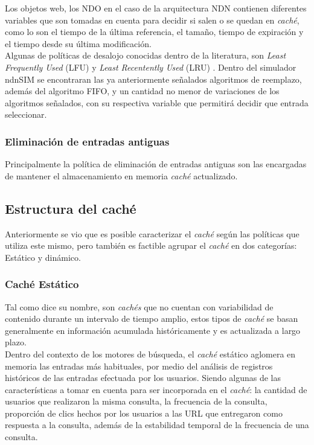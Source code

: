 \documentclass[12pt]{ociamthesis}  %
\begin{document}
Los objetos web, los NDO en el caso de la arquitectura NDN contienen diferentes variables que son tomadas en cuenta para decidir si salen o se quedan en \textit{caché}, como lo son el tiempo de la última referencia, el tamaño, tiempo de expiración y el tiempo desde su última modificación.\\

Algunas de políticas de desalojo conocidas dentro de la literatura, son \textit{Least Frequently Used} (LFU) y \textit{Least Recentently Used}
(LRU) \cite{gomez2014servicios}\cite{gan2009improved}\cite{cambazoglu2010refreshing}. Dentro del simulador ndnSIM se encontraran las ya anteriormente señalados algoritmos de reemplazo, además del algoritmo FIFO, y un cantidad no menor de variaciones de los algoritmos señalados, con su respectiva variable que permitirá decidir que entrada seleccionar.\\

\subsubsection{Eliminación de entradas antiguas}
Principalmente la política de eliminación de entradas antiguas son las encargadas de mantener el almacenamiento en memoria \textit{caché} actualizado.

\subsection{Estructura del caché}
Anteriormente se vio que es posible caracterizar el \textit{caché} según las políticas que utiliza este mismo, pero también es factible agrupar el \textit{caché} en dos categorías: Estático y dinámico.

\subsubsection{Caché Estático}
Tal como dice su nombre, son \textit{cachés} que no cuentan con variabilidad de contenido durante un intervalo de tiempo amplio, estos tipos de \textit{caché} se basan generalmente en información acumulada históricamente y es actualizada a largo plazo.\\

Dentro del contexto de los motores de búsqueda, el \textit{caché} estático aglomera en memoria las entradas más habituales, por medio del análisis de registros históricos de las entradas efectuada por los usuarios. Siendo algunas de las características a tomar en cuenta para ser incorporada en el \textit{caché}: la cantidad de usuarios que realizaron la misma consulta, la frecuencia de la consulta, proporción de clics hechos por los usuarios a las URL que entregaron como respuesta a la consulta, además de la estabilidad temporal de la frecuencia de una consulta.
\end{document}
